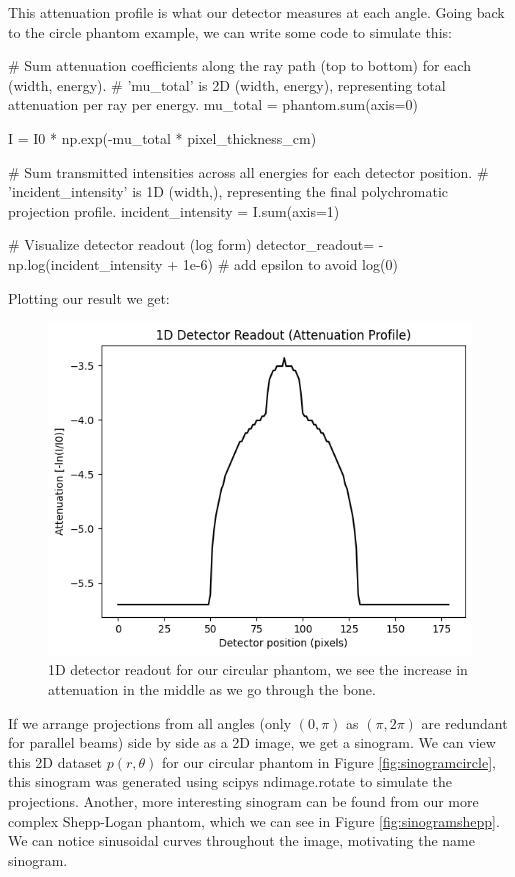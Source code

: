 \documentclass{article}
\begin{document}
This attenuation profile is what our detector measures at each angle. Going back to the circle phantom example, we can write some code to simulate this:

\begin{python}
# Sum attenuation coefficients along the ray path (top to bottom) for each (width, energy).
# 'mu_total' is 2D (width, energy), representing total attenuation per ray per energy.
mu_total = phantom.sum(axis=0)

I = I0 * np.exp(-mu_total * pixel_thickness_cm)

# Sum transmitted intensities across all energies for each detector position.
# 'incident_intensity' is 1D (width,), representing the final polychromatic projection profile.
incident_intensity = I.sum(axis=1)

# Visualize detector readout (log form)
detector_readout= -np.log(incident_intensity + 1e-6)  # add epsilon to avoid log(0)
\end{python}

Plotting our result we get:
\begin{figure}[H]
	\includegraphics[scale=0.6]{detectorreadout.png}
	\caption{1D detector readout for our circular phantom, we see the increase in attenuation in the middle as we go through the bone.}
	\label{fig:detector1d}
\end{figure}

If we arrange projections from all angles (only $(0,\pi)$ as $(\pi, 2\pi)$ are redundant for parallel beams) side by side as a 2D image, we get a sinogram. We can view this 2D dataset $p(r, \theta)$ for our circular phantom in Figure \ref{fig:sinogramcircle}, this sinogram was generated using scipys ndimage.rotate to simulate the projections. 
Another, more interesting sinogram can be found from our more complex Shepp-Logan phantom, which we can see in Figure \ref{fig:sinogramshepp}. We can notice sinusoidal curves throughout the image, motivating the name sinogram.
\end{document}
